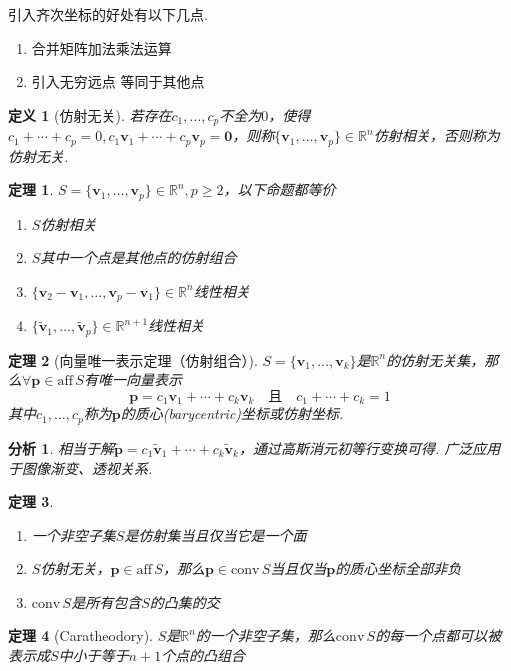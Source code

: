 \documentclass[11pt,UTF8]{ctexart}
\newtheorem{theorem}{定理}
\newtheorem{definition}{定义}
\newtheorem*{analysis}{分析}
\def\vv{\mathbf{v}}
\def\rn{\mathbb{R}^n}
\def\aff{\mathrm{aff}\,}
\def\conv{\mathrm{conv}\,}
\newcommand{\vb}[1]{\mathbf{#1}}
\newcommand{\setenu}[2]{\{#1,\dots,#2\}}
\begin{document}
引入齐次坐标的好处有以下几点.
\begin{enumerate}
	\itemsep -3pt
	\item 合并矩阵加法乘法运算
	\item 引入无穷远点 等同于其他点
\end{enumerate}
\begin{definition}[仿射无关]
若存在$c_1,\dots,c_p$不全为$0$，使得$c_1+\cdots+c_p=0,c_1\vv_1+\cdots+c_p\vv_p=\vb{0}$，则称$\{\vv_1,\dots,\vv_p\}\in\rn$仿射相关，否则称为仿射无关.
\end{definition}
\begin{theorem}$S=\{\vv_1,\dots,\vv_p\}\in\rn,p\geq 2$，以下命题都等价
\begin{enumerate}
	\itemsep -3pt
	\item $S$仿射相关
	\item $S$其中一个点是其他点的仿射组合
	\item $\setenu{\vv_2-\vv_1}{\vv_p-\vv_1}\in\rn$线性相关
	\item $\setenu{\tilde{\vv}_1}{\tilde{\vv}_p}\in\mathbb{R}^{n+1}$线性相关
\end{enumerate}
\end{theorem}
\begin{theorem}[向量唯一表示定理（仿射组合）]
\rm $S=\setenu{\vv_1}{\vv_k}$是$\rn$的仿射无关集，那么$\forall\vb{p}\in\aff S$有唯一向量表示
\[\vb{p}=c_1\vv_1+\cdots+c_k\vv_k\quad\text{且}\quad c_1+\cdots+c_k=1\]
其中$c_1,\dots,c_p$称为$\vb{p}$的质心(barycentric)坐标或仿射坐标.
\end{theorem}
\begin{analysis}
相当于解$\tilde{\vb{p}}=c_1\tilde{\vv}_1+\cdots+c_k\tilde{\vv}_k$，通过高斯消元初等行变换可得. 广泛应用于图像渐变、透视关系.
\end{analysis}
\begin{theorem}
\begin{enumerate}
	\itemsep -3pt
	\item 一个非空子集$S$是仿射集当且仅当它是一个面
	\item $S$仿射无关，$\vb{p}\in\aff S$，那么$\vb{p}\in\conv S$当且仅当$\vb{p}$的质心坐标全部非负
	\item $\conv S$是所有包含$S$的凸集的交
\end{enumerate}
\end{theorem}
\begin{theorem}[Caratheodory]
$S$是$\rn$的一个非空子集，那么$\conv S$的每一个点都可以被表示成$S$中小于等于$n+1$个点的凸组合
\end{theorem}
\end{document}
